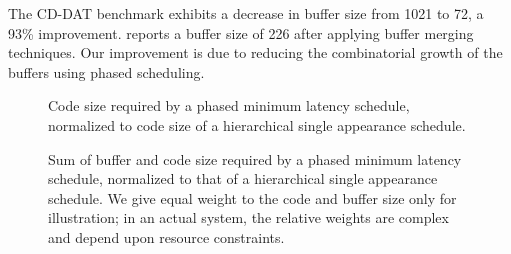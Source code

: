 The CD-DAT benchmark exhibits a decrease in buffer size from 1021 to
72, a 93\% improvement. \cite{murt2000x2} reports a buffer size of 226
after applying buffer merging techniques. Our improvement is due to
reducing the combinatorial growth of the buffers using phased
scheduling.

\begin{figure}[t]
\vspace{6pt}
\centering
{}
\caption{\small Code size required by a phased minimum latency schedule,
normalized to code size of a hierarchical single appearance
schedule.\protect\label{fig:codegraph}}
\end{figure}

\begin{figure}[t]
\caption{\small Sum of buffer and code size required by a phased
minimum latency schedule, normalized to that of a hierarchical single
appearance schedule.  We give equal weight to the code and buffer size
only for illustration; in an actual system, the relative weights are
complex and depend upon resource
constraints. \protect\label{fig:sumgraph}}
\vspace{-4pt}
\end{figure}

